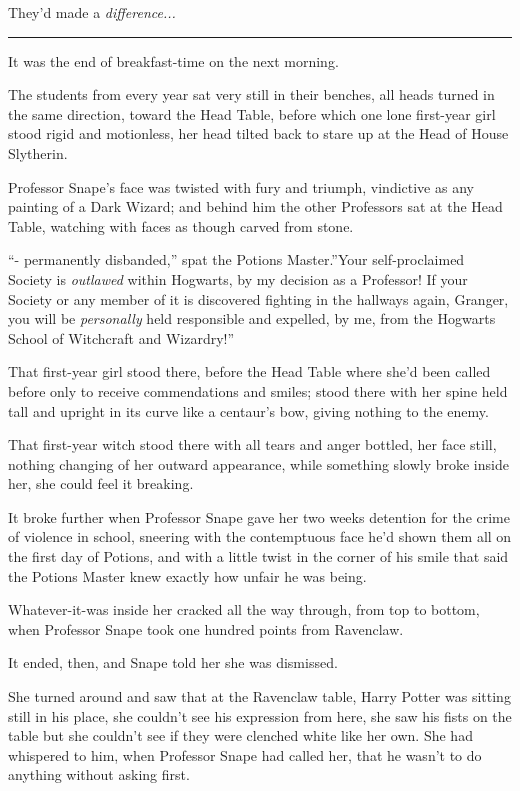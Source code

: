 They'd made a \emph{difference...}

\begin{center}\rule{3in}{0.4pt}\end{center}

It was the end of breakfast-time on the next morning.

The students from every year sat very still in their benches, all heads
turned in the same direction, toward the Head Table, before which one
lone first-year girl stood rigid and motionless, her head tilted back to
stare up at the Head of House Slytherin.

Professor Snape's face was twisted with fury and triumph, vindictive as
any painting of a Dark Wizard; and behind him the other Professors sat
at the Head Table, watching with faces as though carved from stone.

``- permanently disbanded,'' spat the Potions Master.''Your
self-proclaimed Society is \emph{outlawed} within Hogwarts, by my
decision as a Professor! If your Society or any member of it is
discovered fighting in the hallways again, Granger, you will be
\emph{personally} held responsible and expelled, by me, from the
Hogwarts School of Witchcraft and Wizardry!''

That first-year girl stood there, before the Head Table where she'd been
called before only to receive commendations and smiles; stood there with
her spine held tall and upright in its curve like a centaur's bow,
giving nothing to the enemy.

That first-year witch stood there with all tears and anger bottled, her
face still, nothing changing of her outward appearance, while something
slowly broke inside her, she could feel it breaking.

It broke further when Professor Snape gave her two weeks detention for
the crime of violence in school, sneering with the contemptuous face
he'd shown them all on the first day of Potions, and with a little twist
in the corner of his smile that said the Potions Master knew exactly how
unfair he was being.

Whatever-it-was inside her cracked all the way through, from top to
bottom, when Professor Snape took one hundred points from Ravenclaw.

It ended, then, and Snape told her she was dismissed.

She turned around and saw that at the Ravenclaw table, Harry Potter was
sitting still in his place, she couldn't see his expression from here,
she saw his fists on the table but she couldn't see if they were
clenched white like her own. She had whispered to him, when Professor
Snape had called her, that he wasn't to do anything without asking
first.

